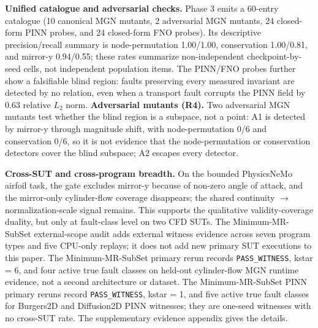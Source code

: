 \documentclass[preprint,12pt]{elsarticle}
\begin{document}
\textbf{Unified catalogue and adversarial checks.} Phase 3 emits a 60-entry catalogue (10 canonical MGN mutants, 2 adversarial MGN mutants, 24 closed-form PINN probes, and 24 closed-form FNO probes). Its descriptive precision/recall summary is node-permutation 1.00/1.00, conservation 1.00/0.81, and mirror-y 0.94/0.55; these rates summarize non-independent checkpoint-by-seed cells, not independent population items. The PINN/FNO probes further show a falsifiable blind region: faults preserving every measured invariant are detected by no relation, even when a transport fault corrupts the PINN field by 0.63 relative \(L_2\) norm. \textbf{Adversarial mutants (R4).} Two adversarial MGN mutants test whether the blind region is a subspace, not a point: A1 is detected by mirror-y through magnitude shift, with node-permutation 0/6 and conservation 0/6, so it is not evidence that the node-permutation or conservation detectors cover the blind subspace; A2 escapes every detector.

\textbf{Cross-SUT and cross-program breadth.} On the bounded PhysicsNeMo airfoil task, the gate excludes mirror-y because of non-zero angle of attack, and the mirror-only cylinder-flow coverage disappears; the shared continuity $\to$ normalization-scale signal remains. This supports the qualitative validity-coverage duality, but only at fault-class level on two CFD SUTs. The Minimum-MR-SubSet external-scope audit adds external witness evidence across seven program types and five CPU-only replays; it does not add new primary SUT executions to this paper. The Minimum-MR-SubSet primary rerun records \texttt{PASS\_WITNESS}, kstar = 6, and four active true fault classes on held-out cylinder-flow MGN runtime evidence, not a second architecture or dataset. The Minimum-MR-SubSet PINN primary reruns record \texttt{PASS\_WITNESS}, kstar = 1, and five active true fault classes for Burgers2D and Diffusion2D PINN witnesses; they are one-seed witnesses with no cross-SUT rate. The supplementary evidence appendix gives the details.
\end{document}
